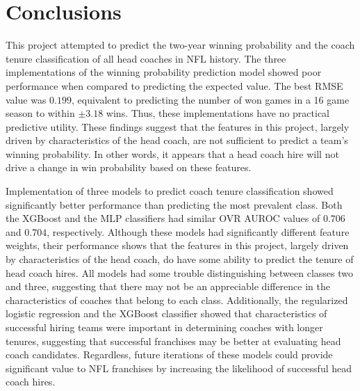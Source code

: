 \documentclass[conference]{IEEEtran}
\begin{document}
\section{Conclusions}
This project attempted to predict the two-year winning probability and the coach tenure classification of all head coaches in NFL history. The three implementations of the winning probability prediction model showed poor performance when compared to predicting the expected value. The best RMSE value was $0.199$, equivalent to predicting the number of won games in a 16 game season to within $\pm3.18$ wins. Thus, these implementations have no practical predictive utility. These findings suggest that the features in this project, largely driven by characteristics of the head coach, are not sufficient to predict a team's winning probability. In other words, it appears that a head coach hire will not drive a change in win probability based on these features.

Implementation of three models to predict coach tenure classification showed significantly better performance than predicting the most prevalent class. Both the XGBoost and the MLP classifiers had similar OVR AUROC values of $0.706$ and $0.704$, respectively. Although these models had significantly different feature weights, their performance shows that the features in this project, largely driven by characteristics of the head coach, do have some ability to predict the tenure of head coach hires. All models had some trouble distinguishing between classes two and three, suggesting that there may not be an appreciable difference in the characteristics of coaches that belong to each class. Additionally, the regularized logistic regression and the XGBoost classifier showed that characteristics of successful hiring teams were important in determining coaches with longer tenures, suggesting that successful franchises may be better at evaluating head coach candidates. Regardless, future iterations of these models could provide significant value to NFL franchises by increasing the likelihood of successful head coach hires.
\end{document}
